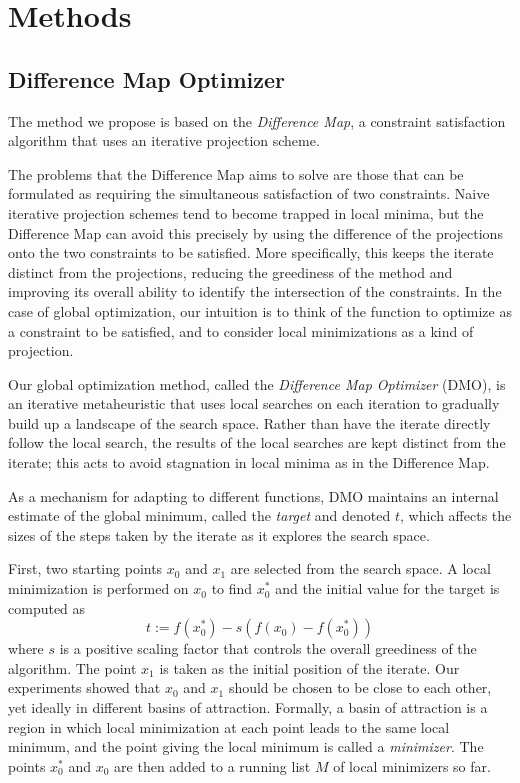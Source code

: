 \documentclass[12pt]{article}
\begin{document}
\section{Methods}

\subsection{Difference Map Optimizer}
The method we propose is based on the \emph{Difference Map}\cite{elser2007}, a
constraint satisfaction algorithm that uses an iterative projection scheme.

The problems that the Difference Map aims to solve are those that can be
formulated as requiring the simultaneous satisfaction of two constraints.
Naive iterative projection schemes tend to become trapped in local minima, but
the Difference Map can avoid this precisely by using the difference of the
projections onto the two constraints to be satisfied.
More specifically, this keeps the iterate distinct from the projections,
reducing the greediness of the method and improving its overall ability to
identify the intersection of the constraints.
In the case of global optimization, our intuition is to think
of the function to optimize as a constraint to be satisfied, and to consider
local minimizations as a kind of projection.

Our global optimization method, called the \emph{Difference Map Optimizer}
(DMO), is an iterative metaheuristic that uses local searches on each
iteration to gradually build up a landscape of the search space.
Rather than have the iterate directly follow the local search, the results of
the local searches are kept distinct from the iterate; this acts to avoid
stagnation in local minima as in the Difference Map.

As a mechanism for adapting to different functions, DMO maintains an internal
estimate of the global minimum, called the \emph{target} and denoted $t$,
which affects the sizes of the steps taken by the iterate as it explores the
search space.

First, two starting points $x_0$ and $x_1$ are selected from the search
space.
A local minimization is performed on $x_0$ to find $x_0^*$ and the
initial value for the target is computed as
$$t := f(x_0^*) - s (f(x_0) - f(x_0^*))$$
where $s$ is a positive scaling factor that controls the overall greediness of
the algorithm.
The point $x_1$ is taken as the initial position of the iterate. Our
experiments showed that $x_0$ and $x_1$ should be chosen to be close to
each other, yet ideally in different basins of attraction.
Formally, a basin of attraction is a region in which local minimization at
each point leads to the same local minimum, and the point giving the local
minimum is called a \emph{minimizer}.
The points $x_0^*$ and $x_0$ are then added to a running list $M$ of
local minimizers so far.
\end{document}
